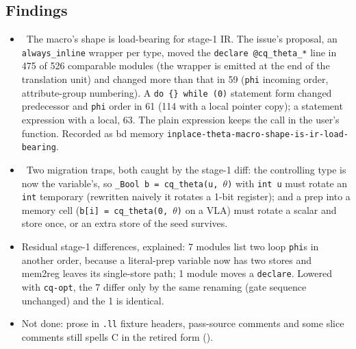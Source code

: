 \subsection*{Findings}
\begin{itemize}
  \item \fconfirmed\ The macro's shape is load-bearing for stage-1 IR. The issue's
  proposal, an \texttt{always\_inline} wrapper per type, moved the
  \texttt{declare @cq\_theta\_*} line in 475 of 526 comparable modules (the wrapper is
  emitted at the end of the translation unit) and changed more than that in 59
  (\texttt{phi} incoming order, attribute-group numbering). A
  \texttt{do \{\} while (0)} statement form changed predecessor and \texttt{phi} order
  in 61 (114 with a local pointer copy); a statement expression with a local, 63. The
  plain expression keeps the call in the user's function. Recorded as bd memory
  \texttt{inplace-theta-macro-shape-is-ir-load-bearing}.
  \item \fconfirmed\ Two migration traps, both caught by the stage-1 diff: the
  controlling type is now the variable's, so \texttt{\_Bool b = cq\_theta(u, $\theta$)} with
  \texttt{int u} must rotate an \texttt{int} temporary (rewritten naively it rotates a
  1-bit register); and a prep into a memory cell (\texttt{b[i] = cq\_theta(0, $\theta$)} on a
  VLA) must rotate a scalar and store once, or an extra store of the seed survives.
  \item Residual stage-1 differences, explained: 7 modules list two loop
  \texttt{phi}s in another order, because a literal-prep variable now has two stores
  and mem2reg leaves its single-store path; 1 module moves a \texttt{declare}. Lowered
  with \texttt{cq-opt}, the 7 differ only by the same renaming (gate sequence
  unchanged) and the 1 is identical.
  \item Not done: prose in \texttt{.ll} fixture headers, pass-source comments and
  some slice comments still spells C in the retired form ().
\end{itemize}

